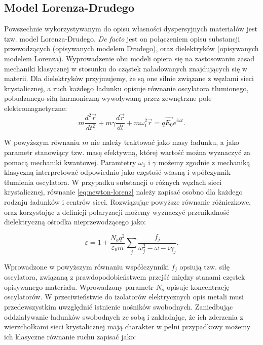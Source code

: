 \subsection{Model Lorenza-Drudego}
\label{subart:lorenz-drude}
Powszechnie wykorzystywanym do opisu własności dyspersyjnych materiałów jest tzw. model Lorenza-Drudego. \textit{De facto} jest on połączeniem opisu substancji przewodzących (opisywanych modelem Drudego), oraz dielektryków (opisywanych modelem Lorenza). Wyprowadzenie obu modeli opiera się na zastosowaniu zasad mechaniki klasycznej w stosunku do cząstek naładowanych znajdujących się w materii. Dla dielektryków przyjmujemy, że są one silnie związane z węzłami sieci krystalicznej, a ruch każdego ładunku opisuje równanie oscylatora tłumionego, pobudzanego siłą harmoniczną wywoływaną przez zewnętrzne pole elektromagnetyczne:
\begin{equation}
m \frac{d^2 \vec{r}}{dt^2} + m \gamma \frac{d \vec{r}}{dt} + m \omega^2_1 \vec{r} = q \vec{E_0} e^{i \omega t}.
\label{eq:newton-lorenz}
\end{equation}

W powyższym równaniu $m$ nie należy traktować jako masy ładunku, a jako parametr stanowiący tzw. masę efektywną, której wartość można wyznaczyć za pomocą mechaniki kwantowej. Paramtetry $\omega_1$ i $\gamma$ możemy zgodnie z mechaniką klasyczną interpretować odpowiednio jako częstość własną i wpółczynnik tłumienia oscylatora. W przypadku substancji o różnych węzłach sieci krystalicznej, równanie \ref{eq:newton-lorenz} należy zapisać osobno dla każdego rodzaju ładunków i centrów sieci. Rozwiązując powyższe równanie różniczkowe, oraz korzystając z definicji polaryzacji możemy wyznaczyć przenikalność dielektryczną ośrodka nieprzewodzącego jako:

\begin{equation}
\varepsilon = 1 + \frac{N_o q^2}{\varepsilon_0 m} \sum_j \frac{f_j}{\omega_j^2 - \omega - i \gamma_j}.
\label{eq:lorenz}
\end{equation}

Wprowadzone w powyższym równaniu współczynniki $f_j$ opsiują tzw. siłę oscylatora, związaną z prawdopodobieństwem przejść między stanami częstek opisywanego materiału. Wprowadzony parametr $N_o$ opisuje koncentrację oscylatorów.  W przeciwieństwie do izolatorów elektrycznych opis metali musi przedewszystkim uwzględnić istnienie nośników swobodnych. Zaniedbując oddziaływanie ładunków swobodnych ze sobą i zakładając, że ich zderzenia z wierzchołkami sieci krystalicznej mają charakter w pełni przypadkowy możemy ich klasyczne równanie ruchu zapisać jako:

